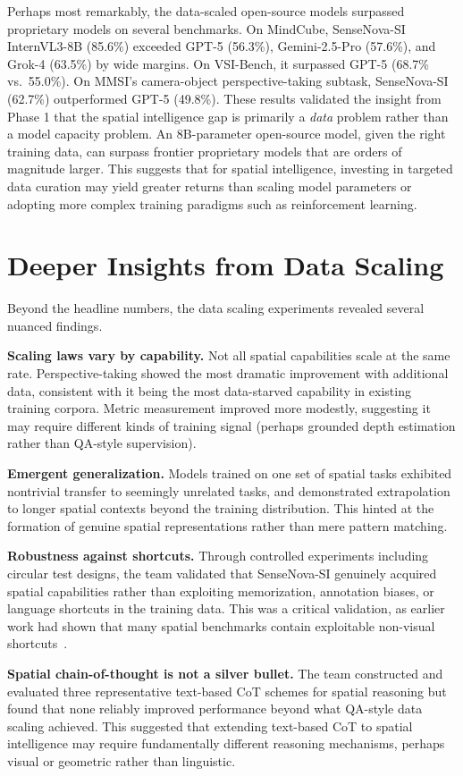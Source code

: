 Perhaps most remarkably, the data-scaled open-source models surpassed proprietary models on several benchmarks. On MindCube, SenseNova-SI InternVL3-8B (85.6\%) exceeded GPT-5 (56.3\%), Gemini-2.5-Pro (57.6\%), and Grok-4 (63.5\%) by wide margins. On VSI-Bench, it surpassed GPT-5 (68.7\% vs.\ 55.0\%). On MMSI's camera-object perspective-taking subtask, SenseNova-SI (62.7\%) outperformed GPT-5 (49.8\%). These results validated the insight from Phase 1 that the spatial intelligence gap is primarily a \textit{data} problem rather than a model capacity problem. An 8B-parameter open-source model, given the right training data, can surpass frontier proprietary models that are orders of magnitude larger. This suggests that for spatial intelligence, investing in targeted data curation may yield greater returns than scaling model parameters or adopting more complex training paradigms such as reinforcement learning.

\section{Deeper Insights from Data Scaling}

Beyond the headline numbers, the data scaling experiments revealed several nuanced findings.

\textbf{Scaling laws vary by capability.} Not all spatial capabilities scale at the same rate. Perspective-taking showed the most dramatic improvement with additional data, consistent with it being the most data-starved capability in existing training corpora. Metric measurement improved more modestly, suggesting it may require different kinds of training signal (perhaps grounded depth estimation rather than QA-style supervision).

\textbf{Emergent generalization.} Models trained on one set of spatial tasks exhibited nontrivial transfer to seemingly unrelated tasks, and demonstrated extrapolation to longer spatial contexts beyond the training distribution. This hinted at the formation of genuine spatial representations rather than mere pattern matching.

\textbf{Robustness against shortcuts.} Through controlled experiments including circular test designs, the team validated that SenseNova-SI genuinely acquired spatial capabilities rather than exploiting memorization, annotation biases, or language shortcuts in the training data. This was a critical validation, as earlier work had shown that many spatial benchmarks contain exploitable non-visual shortcuts~\cite{brown2025benchmarkdesignerstraintest}.

\textbf{Spatial chain-of-thought is not a silver bullet.} The team constructed and evaluated three representative text-based CoT schemes for spatial reasoning but found that none reliably improved performance beyond what QA-style data scaling achieved. This suggested that extending text-based CoT to spatial intelligence may require fundamentally different reasoning mechanisms, perhaps visual or geometric rather than linguistic.

